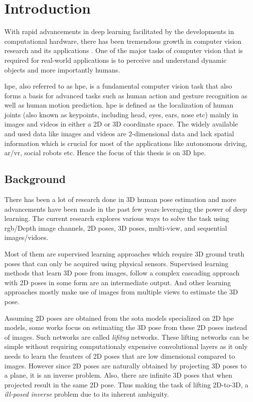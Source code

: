 \chapter{Introduction}
\label{chap:introduction}
With rapid advancements in deep learning facilitated by the developments in computational hardware, there has been tremendous growth in computer vision research and its applications \cite{AIandCompute}. One of the major tasks of computer vision that is required for real-world applications is to perceive and understand dynamic objects and more importantly humans.

\acl{hpe}, also referred to as \ac{hpe}, is a fundamental computer vision task that also forms a basis for advanced tasks such as human action and gesture recognition as well as human motion prediction. \ac{hpe} is defined as the localization of human joints (also known as keypoints, including head, eyes, ears, nose etc) mainly in images and videos in either a 2D or 3D coordinate space. The widely available and used data like images and videos are 2-dimensional data and lack spatial information which is crucial for most of the applications like autonomous driving, \ac{ar/vr}, social robots etc. Hence the focus of this thesis is on 3D \ac{hpe}.

\section{Background}
\label{sec:background}

There has been a lot of research done in 3D human pose estimation and more advancements have been made in the past few years leveraging the power of deep learning. The current research explores various ways to solve the task using \ac{rgb}/Depth image channels, 2D poses, 3D poses, multi-view, and sequential images/vidoes. 

Most of them are supervised learning approaches which require 3D ground truth poses that can only be acquired using physical sensors. Supervised learning methods that learn 3D pose from images, follow a complex cascading approach with 2D poses in some form are an intermediate output. And other learning approaches mostly make use of images from multiple views to estimate the 3D pose. 

Assuming 2D poses are obtained from the \ac{sota} models specialized on 2D \ac{hpe} models, some works focus on estimating the 3D pose from these 2D poses instead of images. Such networks are called \textit{lifitng} networks. These lifting networks can be simple without requiring computationaly expensive convolutional layers as it only needs to learn the feauters of 2D poses that are low dimensional compared to images. However since 2D poses are naturally obtained by projecting 3D poses to a plane, it is an inverse problem. Also, there are infinite 3D poses that when projected result in the same 2D pose. Thus making the task of lifting 2D-to-3D, a \textit{ill-posed inverse} problem due to its inherent ambiguity.

